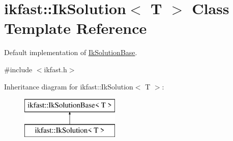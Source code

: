 \hypertarget{classikfast_1_1IkSolution}{\section{ikfast\-:\-:Ik\-Solution$<$ T $>$ Class Template Reference}
\label{classikfast_1_1IkSolution}
}


Default implementation of \hyperlink{classikfast_1_1IkSolutionBase}{Ik\-Solution\-Base}.  




{\ttfamily \#include $<$ikfast.\-h$>$}

Inheritance diagram for ikfast\-:\-:Ik\-Solution$<$ T $>$\-:\begin{figure}[H]
\begin{center}
\leavevmode
\includegraphics[height=2.000000cm]{classikfast_1_1IkSolution}
\end{center}
\end{figure}
